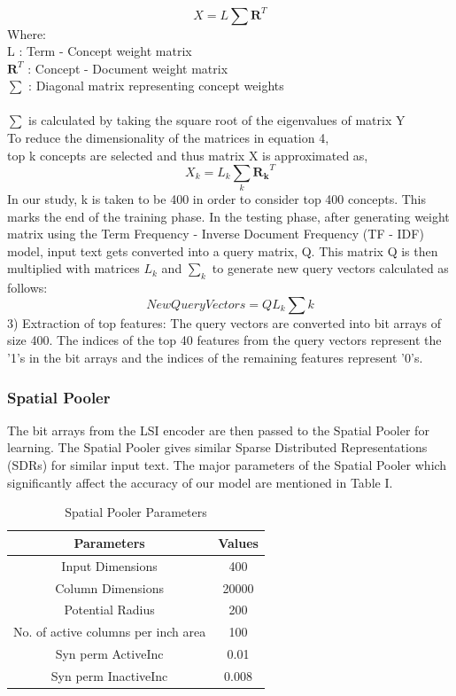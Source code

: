 \documentclass[12pt]{article}
\begin{document}
\begin{multicols}{2}
\begin{equation}
X = L \sum \mathbf{R}^T
\end{equation}
Where:\\
L : Term - Concept weight matrix\\
$\mathbf{R}^T$ : Concept - Document weight matrix\\
$\sum$ : Diagonal matrix representing concept weights\\\\
$\sum$ is calculated by taking the square root of the eigenvalues
of matrix Y\\
To reduce the dimensionality of the matrices in equation 4,\\
top k concepts are selected and thus matrix X is approximated
as,
\begin{equation}
X_{k} = L_{k} \sum_{k} \mathbf{R_{k}}^T
\end{equation}
In our study, k is taken to be 400 in order to consider top 400 concepts. This marks the end of the training phase. In the testing phase, after generating weight matrix using
the Term Frequency - Inverse Document Frequency (TF - IDF) model, input text gets converted into a query matrix, Q. This matrix Q is then multiplied with matrices $L_{k}$ and $\sum_{k}$
to generate new query vectors calculated as follows:\\
\begin{equation}
NewQueryVectors = QL_{k} \sum k
\end{equation}
3) Extraction of top features: The query vectors are converted into bit arrays of size 400. The indices of the top 40 features from the query vectors represent the ’1’s in the bit
arrays and the indices of the remaining features represent ’0’s.
\subsubsection{Spatial Pooler}
The bit arrays from the LSI encoder are then passed to the Spatial Pooler for learning. The Spatial Pooler gives similar Sparse Distributed Representations (SDRs) for similar input text. The major parameters of the Spatial Pooler which significantly affect the accuracy of our model are mentioned in Table I.
\end{multicols}
\begin{table}[h]
\caption{Spatial Pooler Parameters}
\begin{center}
\begin{tabular}{|c|c|}
\hline
Parameters & Values\\
\hline
Input Dimensions & 400\\
\hline
Column Dimensions & 20000\\
\hline
Potential Radius & 200\\
\hline
No. of active columns per inch area &  100\\
\hline
Syn perm ActiveInc & 0.01\\
\hline
Syn perm InactiveInc & 0.008\\
\hline
\end{tabular}
\end{center}
\end{table}
\end{document}
